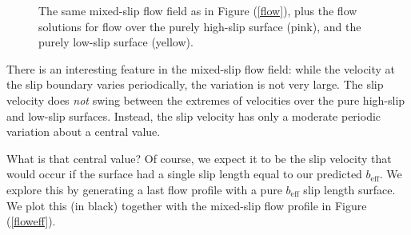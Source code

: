 \documentclass[12pt, a4paper, twoside, openright]{book}
\newcommand{\beff}{\ensuremath{b_{\mathrm{eff}}}}
\begin{document}
\begin{figure}[ht]
\centering
{}
\caption{The same mixed-slip flow field as in Figure (\ref{flow}), plus the flow solutions for flow over the purely high-slip surface (pink), and the purely low-slip surface (yellow).}\label{flowhilo}
\end{figure}

There is an interesting feature in the mixed-slip flow field: while the velocity at the slip boundary varies periodically, the variation is not very large.  The slip velocity does \emph{not} swing between the extremes of velocities over the pure high-slip and low-slip surfaces.  Instead, the slip velocity has only a moderate periodic variation about a central value.

What is that central value?  Of course, we expect it to be the slip velocity that would occur if the surface had a single slip length equal to our predicted $\beff$.
We explore this by generating a last flow profile with a pure $\beff$ slip length surface.  We plot this (in black) together with the mixed-slip flow profile in Figure (\ref{floweff}).
\end{document}
